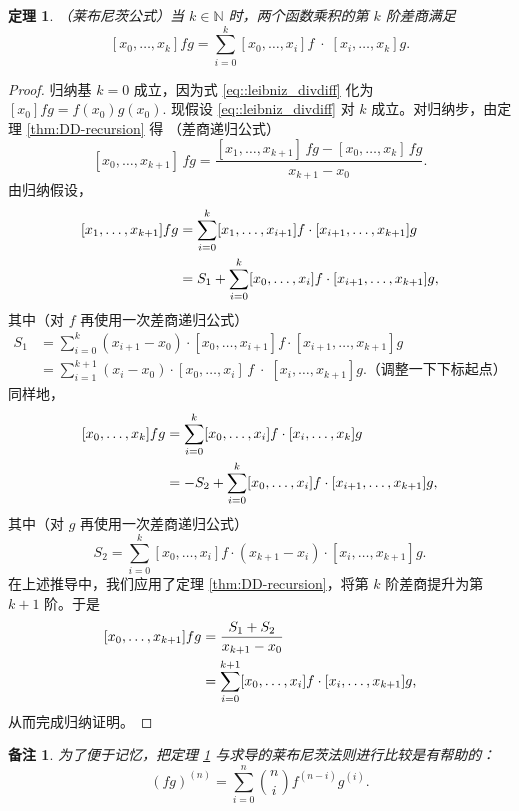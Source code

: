 \documentclass[a4paper]{ctexart}
\newtheorem{theorem}{定理}
\newtheorem{remark}{备注}
\numberwithin{theorem}{section}
\numberwithin{equation}{section}
\numberwithin{figure}{section}
\numberwithin{remark}{section}
\begin{document}
\begin{theorem}
    \label{thm::leibniz_divided_difference}
（莱布尼茨公式）当 $k\in\mathbb{N}$ 时，两个函数乘积的第 $k$ 阶差商满足
\begin{equation}
\label{eq::leibniz_divdiff}
[x_0,\ldots,x_k]fg=\sum_{i=0}^{k}[x_0,\ldots,x_i]f\;\cdot\;[x_i,\ldots,x_k]g.
\end{equation}
\end{theorem}

\begin{proof}
归纳基 $k=0$ 成立，因为式 \eqref{eq::leibniz_divdiff} 化为 $[x_0]fg=f(x_0)g(x_0)$. 
现假设 \eqref{eq::leibniz_divdiff} 对 $k$ 成立。对归纳步，由定理 \ref{thm:DD-recursion} 得 （差商递归公式）
\[
[x_0,\ldots,x_{k+1}]\,fg=\frac{[x_1,\ldots,x_{k+1}]\,fg-[x_0,\ldots,x_k]\,fg}{x_{k+1}-x_0}.
\]
由归纳假设，
\[
\begin{aligned}
\relax [x_1,\ldots,x_{k+1}] fg &=\sum_{i=0}^{k}[x_1,\ldots,x_{i+1}]f\cdot[x_{i+1},\ldots,x_{k+1}]g \\
&= S_1+\sum_{i=0}^{k}[x_0,\ldots,x_i]f\cdot[x_{i+1},\ldots,x_{k+1}]g,    
\end{aligned}
\]
其中（对 $f$ 再使用一次差商递归公式）
\[
\begin{aligned}
S_1&=\sum_{i=0}^{k}(x_{i+1}-x_0)\cdot [x_0,\ldots,x_{i+1}]f\cdot[x_{i+1},\ldots,x_{k+1}]g \\
&=\sum_{i=1}^{k+1}(x_i-x_0)\cdot [x_0,\ldots,x_i]\,f\;\cdot\;[x_i,\ldots,x_{k+1}]g. \mbox{（调整一下下标起点）}
\end{aligned}
\]
同样地，
\[
\begin{aligned}
\relax [x_0,\ldots,x_k]fg&=\sum_{i=0}^{k}[x_0,\ldots,x_i]f\cdot[x_i,\ldots,x_k]g \\
&= -S_2+\sum_{i=0}^{k}[x_0,\ldots,x_i]f\cdot[x_{i+1},\ldots,x_{k+1}]g,
\end{aligned}
\]
其中（对 $g$ 再使用一次差商递归公式）
\[
S_2=\sum_{i=0}^{k}[x_0,\ldots,x_i]f\cdot (x_{k+1}-x_i)\cdot [x_i,\ldots,x_{k+1}]g.
\]
在上述推导中，我们应用了定理 \ref{thm:DD-recursion}，将第 $k$ 阶差商提升为第 $k+1$ 阶。于是
\[
\begin{aligned}
\relax [x_0,\ldots,x_{k+1}]fg& =\frac{S_1+S_2}{x_{k+1}-x_0} \\
&=\sum_{i=0}^{k+1}[x_0,\ldots,x_i]f\cdot[x_i,\ldots,x_{k+1}]g,    
\end{aligned}
\]
从而完成归纳证明。
\end{proof}

\begin{remark}
    \label{rem::compare_leibniz_rule}
为了便于记忆，把定理 \ref{thm::leibniz_divided_difference} 与求导的莱布尼茨法则进行比较是有帮助的：
\begin{equation*}
(fg)^{(n)}=\sum_{i=0}^{n}\binom{n}{i} f^{(n-i)}g^{(i)}.
\end{equation*}
\end{remark}
\end{document}
